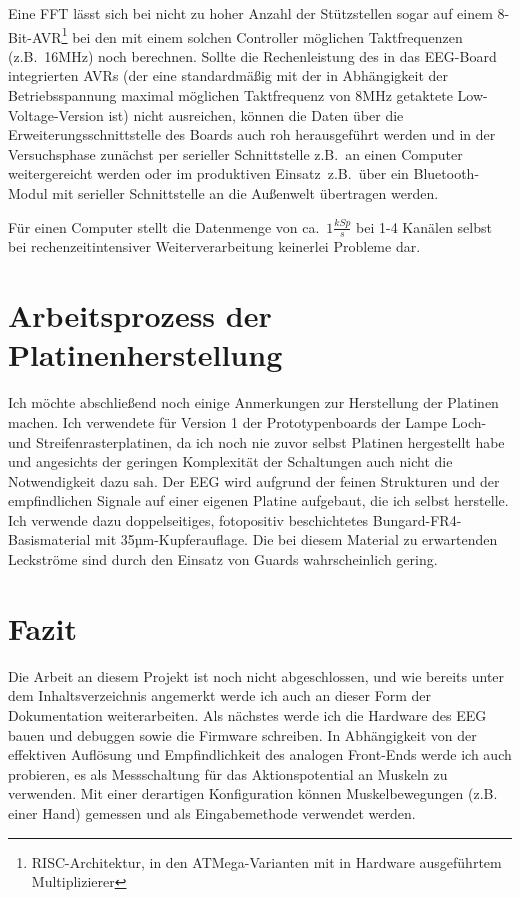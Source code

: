 \documentclass[12pt,a4paper,notitlepage]{article}
\begin{document}
Eine FFT lässt sich bei nicht zu hoher Anzahl der Stützstellen sogar auf einem 8-Bit-AVR\footnote{RISC-Architektur, in den \glqq ATMega\grqq-Varianten mit in Hardware ausgeführtem Multiplizierer} bei den mit einem solchen Controller möglichen Taktfrequenzen (z.B.\ 16MHz) noch berechnen\cite{LOMBARD1}. Sollte die Rechenleistung des in das EEG-Board integrierten AVRs (der eine standardmäßig mit der in Abhängigkeit der Betriebsspannung maximal möglichen Taktfrequenz von 8MHz getaktete Low-Voltage-Version ist) nicht ausreichen, können die Daten über die Erweiterungsschnittstelle des Boards auch roh herausgeführt werden und in der Versuchsphase zunächst per serieller Schnittstelle z.B.\ an einen Computer weitergereicht werden oder im \glqq produktiven Einsatz\grqq\ z.B.\ über ein Bluetooth-Modul mit serieller Schnittstelle an die Außenwelt übertragen werden.

Für einen Computer stellt die Datenmenge von ca.\ $1\frac{kSp}{s}$ bei 1-4 Kanälen selbst bei rechenzeitintensiver Weiterverarbeitung keinerlei Probleme dar.

\section{Arbeitsprozess der Platinenherstellung}
Ich möchte abschließend noch einige Anmerkungen zur Herstellung der Platinen machen. Ich verwendete für Version 1 der Prototypenboards der Lampe Loch- und Streifenrasterplatinen, da ich noch nie zuvor selbst Platinen hergestellt habe und angesichts der geringen Komplexität der Schaltungen auch nicht die Notwendigkeit dazu sah. Der EEG wird aufgrund der feinen Strukturen und der empfindlichen Signale auf einer eigenen Platine aufgebaut, die ich selbst herstelle. Ich verwende dazu doppelseitiges, fotopositiv beschichtetes Bungard-FR4-Basismaterial mit 35µm-Kupferauflage. Die bei diesem Material zu erwartenden Leckströme sind durch den Einsatz von Guards wahrscheinlich gering\cite{BUNGARD1,ANALOG1,ANALOG2,MAXIM56,MAXIM55,MAXIM52}.

\section{Fazit}
Die Arbeit an diesem Projekt ist noch nicht abgeschlossen, und wie bereits unter dem Inhaltsverzeichnis angemerkt werde ich auch an dieser Form der Dokumentation weiterarbeiten. Als nächstes werde ich die Hardware des \gls{EEG} bauen und debuggen sowie die Firmware schreiben. In Abhängigkeit von der effektiven Auflösung und Empfindlichkeit des analogen Front-Ends werde ich auch probieren, es als Messschaltung für das Aktionspotential an Muskeln zu verwenden. Mit einer derartigen Konfiguration können Muskelbewegungen (z.B. einer Hand) gemessen und als Eingabemethode verwendet werden\cite{WP21,MULDER1}.
\end{document}
